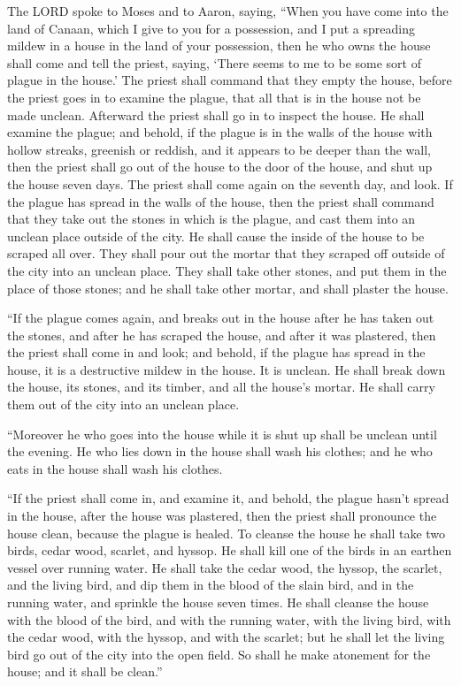\myverse{}The LORD spoke to Moses and to Aaron, saying,
\myverse{}“When you have come into the land of Canaan, which I give to you for a possession,
and I put a spreading mildew in a house in the land of your possession,
\myverse{}then he who owns the house shall come and tell the priest, saying, ‘There
seems to me to be some sort of plague in the house.’
\myverse{}The priest shall command that they empty the house, before the priest goes
in to examine the plague, that all that is in the house not be made unclean. Afterward the priest shall
go in to inspect the house.
\myverse{}He shall examine the plague; and behold, if the plague is in the walls of
the house with hollow streaks, greenish or reddish, and it appears to be deeper than the wall,
\myverse{}then the priest shall go out of the house to the door of the house, and shut
up the house seven days.
\myverse{}The priest shall come again on the seventh day, and look. If the plague has
spread in the walls of the house,
\myverse{}then the priest shall command that they take out the stones in which is the
plague, and cast them into an unclean place outside of the city.
\myverse{}He shall cause the inside of the house to be scraped all over. They shall
pour out the mortar that they scraped off outside of the city into an unclean place.
\myverse{}They shall take other stones, and put them in the place of those stones;
and he shall take other mortar, and shall plaster the house.


\myverse{}“If the plague comes again, and breaks out in the house after
he has taken out the stones, and after he has scraped the house, and after it was plastered,
\myverse{}then the priest shall come in and look; and behold, if the plague has spread
in the house, it is a destructive mildew in the house. It is unclean.
\myverse{}He shall break down the house, its stones, and its timber, and all the house’s
mortar. He shall carry them out of the city into an unclean place.


\myverse{}“Moreover he who goes into the house while it is shut up shall
be unclean until the evening.
\myverse{}He who lies down in the house shall wash his clothes; and he who eats in
the house shall wash his clothes.


\myverse{}“If the priest shall come in, and examine it, and behold, the
plague hasn’t spread in the house, after the house was plastered, then the priest shall pronounce the
house clean, because the plague is healed.
\myverse{}To cleanse the house he shall take two birds, cedar wood, scarlet, and hyssop.
\myverse{}He shall kill one of the birds in an earthen vessel over running water.
\myverse{}He shall take the cedar wood, the hyssop, the scarlet, and the living bird,
and dip them in the blood of the slain bird, and in the running water, and sprinkle the house seven times.
\myverse{}He shall cleanse the house with the blood of the bird, and with the running
water, with the living bird, with the cedar wood, with the hyssop, and with the scarlet;
\myverse{}but he shall let the living bird go out of the city into the open field.
So shall he make atonement for the house; and it shall be clean.”



